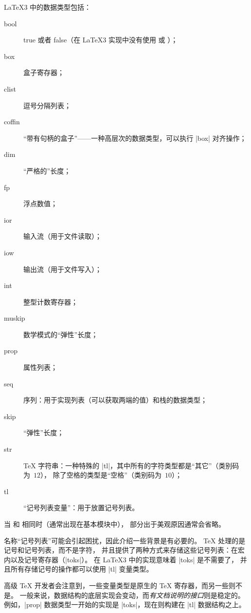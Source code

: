 \documentclass{l3doc}
\begin{document}
\LaTeX3 中的数据类型包括：
\begin{description}
    \item[bool] true 或者 false（在 \LaTeX3 实现中没有使用  或 ）；
    \item[box] 盒子寄存器；
    \item[clist] 逗号分隔列表；
    \item[coffin] “带有句柄的盒子”——一种高层次的数据类型，可以执行 |box| 对齐操作；
    \item[dim] “严格的”长度；
    \item[fp] 浮点数值；
    \item[ior] 输入流（用于文件读取）；
    \item[iow] 输出流（用于文件写入）；
    \item[int] 整型计数寄存器；
    \item[muskip] 数学模式的“弹性”长度；
    \item[prop] 属性列表；
    \item[seq] 序列：用于实现列表（可以获取两端的值）和栈的数据类型；
    \item[skip] “弹性”长度；
    \item[str] \TeX{} 字符串：一种特殊的 |tl|，其中所有的字符类型都是“其它”（类别码为~$12$），
    除了空格的类型是“空格”（类别码为~$10$）；
    \item[tl] “记号列表变量”：用于放置记号列表。
\end{description}
当  和  相同时（通常出现在基本模块中），
 部分出于美观原因通常会省略。

%

名称“记号列表”可能会引起困扰，因此介绍一些背景是有必要的。
\TeX{} 处理的是记号和记号列表，而不是字符，
并且提供了两种方式来存储这些记号列表：在宏内以及记号寄存器（|toks|）。
在 \LaTeX3 中的实现意味着 |toks| 是不需要了，
并且所有存储记号的操作都可以使用 |tl| 变量类型。

%
高级 \TeX{} 开发者会注意到，一些变量类型是原生的 \TeX{} 寄存器，而另一些则不是。
一般来说，数据结构的底层实现会变动，而\emph{有文档说明的接口}则是稳定的。
例如，|prop| 数据类型一开始的实现是 |toks|，现在则构建在 |tl| 数据结构之上。
\end{document}
